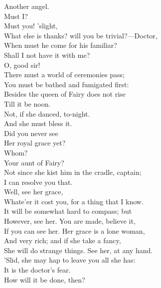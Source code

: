 \documentclass[a4paper,oneside,12pt]{memoir}
\begin{document}
\begin{drama*}
Another angel.\\
\dapperspeaks {} Must I?\\
\facespeaks {} Must you! 'slight,\\
What else is thanks? will you be trivial?---Doctor,\\
When must he come for his familiar?\\
\dapperspeaks Shall I not have it with me?\\
\subtlespeaks {} O, good sir!\\
There must a world of ceremonies pass;\\
You must be bathed and fumigated first:\\
Besides the queen of Fairy does not rise\\
Till it be noon.\\
\facespeaks {} Not, if she danced, to-night.\\
\subtlespeaks And she must bless it.\\
\facespeaks {} Did you never see\\
Her royal grace yet?\\
\dapperspeaks {} Whom?\\
\facespeaks {} Your aunt of Fairy?\\
\subtlespeaks Not since she kist him in the cradle, captain;\\
I can resolve you that.\\
\facespeaks {} Well, see her grace,\\
Whate'er it cost you, for a thing that I know.\\
It will be somewhat hard to compass; but\\
However, see her. You are made, believe it,\\
If you can see her. Her grace is a lone woman,\\
And very rich; and if she take a fancy,\\
She will do strange things. See her, at any hand.\\
'Slid, she may hap to leave you all she has:\\
It is the doctor's fear.\\
\dapperspeaks {} How will it be done, then?\\

\end{drama*}
\end{document}
